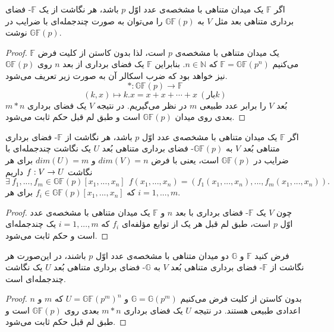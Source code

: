 \begin{lemma}
اگر 
$\mathbb{F}$
یک میدان متناهی با مشخصه‌ی عدد اوّل 
$p$
باشد، هر نگاشت از یک 
$\mathbb{F}$-
فضای برداری متناهی بعد مثل 
$V$
به 
$\mathbb{GF}(p)$
را می‌توان به صورت چندجمله‌ای با ضرایب در 
$\mathbb{GF}(p)$
نوشت.

\begin{proof}
$\mathbb{F}$
یک میدان متناهی با مشخصه‌ی 
$p$
است، لذا بدون کاستن از کلیت فرض می‌کنیم 
$\mathbb{F} = \mathbb{GF}(p^{n})$
که 
$n\in \mathbb{N}$.
 بنابراین  
 $\mathbb{F}$
 یک فضای برداری از بعد 
 $n$
 روی 
 $\mathbb{GF}(p)$
 نیز خواهد بود که ضرب اسکالر آن به صورت زیر تعریف می‌شود.
 	$$* :\mathbb{GF}(p)\rightarrow \mathbb{F}$$
 	$$(k,x)\mapsto k.x = x+x+\cdots+x  \ (\text{بار}k)$$
بُعد
$V$
را برابر عدد طبیعی 
$m$
در نظر می‌گیریم. در نتیجه 
$V$
یک فضای برداری 
$m*n$
بعدی روی میدان
$\mathbb{GF}(p)$
است و طبق لم قبل حکم ثابت می‌شود.
\end{proof}
\end{lemma}

\begin{lemma}
اگر 
$\mathbb{F}$
یک میدان متناهی با مشخصه‌ی عدد اوّل 
$p$
باشد، هر نگاشت از 
$\mathbb{F}$-
فضای برداری متناهی بُعد 
$V$
به 
$\mathbb{GF}(p)$-
فضای برداری متناهی بُعد 
$U$
 یک نگاشت چندجمله‌ای با ضرایب در
 $\mathbb{GF}(p)$
 است، یعنی با فرض 
 $dim(V) = n$
 و 
 $dim(U) = m$
 برای هر نگاشت 
 $f:V\rightarrow U$
 داریم
 $$\exi \ f_{1},...,f_{m}\in\mathbb{GF}(p)[x_{1},...,x_{n}] \  \ f(x_{1},...,x_{n}) = (f_{1}(x_{1},...,x_{n}),..., f_{m}(x_{1},..., x_{n})).$$
 که 
 $f_{i}\in\mathbb{GF}(p)[x_{1},..., x_{n}]$
 برای هر 
 $i = 1,...,m$.
 \begin{proof}
 	چون 
 	$V$
 	یک 
 	$\mathbb{F}$-
 	فضای برداری با بعد 
 	$n$
 	 و 
 	 $\mathbb{F}$
 	 یک میدان متناهی با مشخصه‌ی عدد اوّل 
 	 $p$
 	 است، طبق لم قبل هر یک از توابع مؤلفه‌ای 
 	 $f_{i}$
 	 که 
 	 $i = 1,...,m$
 	 یک چندجمله‌ای است و حکم ثابت می‌شود.
 \end{proof}
\end{lemma}

\begin{lemma}
	\label{unimaplem4}
فرض کنید 
$\mathbb{F}$
و 
$\mathbb{G}$
دو میدان متناهی با مشخصه‌ی عدد اوّل 
$p$
باشند، در این‌صورت هر نگاشت از 
$\mathbb{F}$-
فضای برداری متناهی بُعد 
$V$
به 
$\mathbb{G}$-
فضای برداری متناهی بُعد 
$U$
 یک نگاشت چند‌جمله‌ای است.
 \begin{proof}
بدون کاستن از کلیت فرض می‌کنیم 
$\mathbb{G} = \mathbb{G}(p^{m})$
و 
$U = \mathbb{GF}(p^{m})^{n}$
که 
$m$
و
$n$
اعدادی طبیعی هستند. در نتیجه 
$U$
یک فضای برداری 
$m*n$
بعدی روی 
$\mathbb{GF}(p)$
است و طبق لم قبل حکم ثابت می‌شود.
 \end{proof}
\end{lemma}

